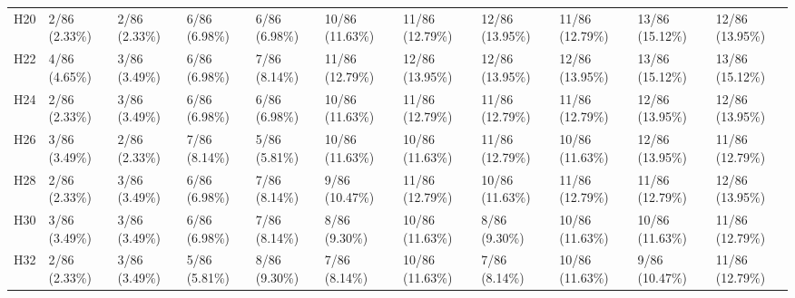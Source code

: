 \begin{table}[tbp]
\begin{tabular}{lllllllllll}
H20 & 2/86 (2.33\%) & 2/86 (2.33\%) & 6/86 (6.98\%) & 6/86 (6.98\%) & 10/86 (11.63\%) & 11/86 (12.79\%) & 12/86 (13.95\%) & 11/86 (12.79\%) & 13/86 (15.12\%) & 12/86 (13.95\%) \\
H22 & 4/86 (4.65\%) & 3/86 (3.49\%) & 6/86 (6.98\%) & 7/86 (8.14\%) & 11/86 (12.79\%) & 12/86 (13.95\%) & 12/86 (13.95\%) & 12/86 (13.95\%) & 13/86 (15.12\%) & 13/86 (15.12\%) \\
H24 & 2/86 (2.33\%) & 3/86 (3.49\%) & 6/86 (6.98\%) & 6/86 (6.98\%) & 10/86 (11.63\%) & 11/86 (12.79\%) & 11/86 (12.79\%) & 11/86 (12.79\%) & 12/86 (13.95\%) & 12/86 (13.95\%) \\
H26 & 3/86 (3.49\%) & 2/86 (2.33\%) & 7/86 (8.14\%) & 5/86 (5.81\%) & 10/86 (11.63\%) & 10/86 (11.63\%) & 11/86 (12.79\%) & 10/86 (11.63\%) & 12/86 (13.95\%) & 11/86 (12.79\%) \\
H28 & 2/86 (2.33\%) & 3/86 (3.49\%) & 6/86 (6.98\%) & 7/86 (8.14\%) & 9/86 (10.47\%) & 11/86 (12.79\%) & 10/86 (11.63\%) & 11/86 (12.79\%) & 11/86 (12.79\%) & 12/86 (13.95\%) \\
H30 & 3/86 (3.49\%) & 3/86 (3.49\%) & 6/86 (6.98\%) & 7/86 (8.14\%) & 8/86 (9.30\%) & 10/86 (11.63\%) & 8/86 (9.30\%) & 10/86 (11.63\%) & 10/86 (11.63\%) & 11/86 (12.79\%) \\
H32 & 2/86 (2.33\%) & 3/86 (3.49\%) & 5/86 (5.81\%) & 8/86 (9.30\%) & 7/86 (8.14\%) & 10/86 (11.63\%) & 7/86 (8.14\%) & 10/86 (11.63\%) & 9/86 (10.47\%) & 11/86 (12.79\%) \\
\bottomrule
\end{tabular}
\end{table}
